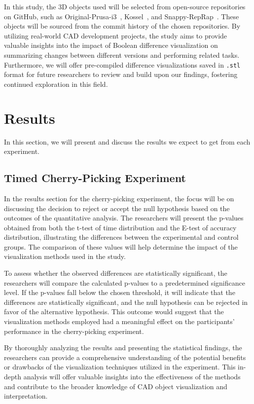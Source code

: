 \documentclass[sigconf,authorversion,nonacm]{acmart}
\begin{document}
In this study, the 3D objects used will be selected from open-source repositories on GitHub, such as Original-Prusa-i3~\cite{prusa3d_2022}, Kossel~\cite{ jcrocholl_2015}, and Snappy-RepRap~\cite{revarbat_2019}.
These objects will be sourced from the commit history of the chosen repositories. By utilizing real-world CAD development projects, the study aims to provide valuable insights into the impact of Boolean difference visualization on summarizing changes between different versions and performing related tasks.
Furthermore, we will offer pre-compiled difference visualizations saved in \texttt{.stl} format for future researchers to review and build upon our findings, fostering continued exploration in this field.

\section{Results}

In this section, we will present and discuss the results we expect to get from each experiment.

\subsection{Timed Cherry-Picking Experiment}

In the results section for the cherry-picking experiment, the focus will be on discussing the decision to reject or accept the null hypothesis based on the outcomes of the quantitative analysis.
The researchers will present the p-values obtained from both the t-test of time distribution and the E-test of accuracy distribution, illustrating the differences between the experimental and control groups.
The comparison of these values will help determine the impact of the visualization methods used in the study.

To assess whether the observed differences are statistically significant, the researchers will compare the calculated p-values to a predetermined significance level.
If the p-values fall below the chosen threshold, it will indicate that the differences are statistically significant, and the null hypothesis can be rejected in favor of the alternative hypothesis.
This outcome would suggest that the visualization methods employed had a meaningful effect on the participants' performance in the cherry-picking experiment.

By thoroughly analyzing the results and presenting the statistical findings, the researchers can provide a comprehensive understanding of the potential benefits or drawbacks of the visualization techniques utilized in the experiment.
This in-depth analysis will offer valuable insights into the effectiveness of the methods and contribute to the broader knowledge of CAD object visualization and interpretation.
\end{document}
